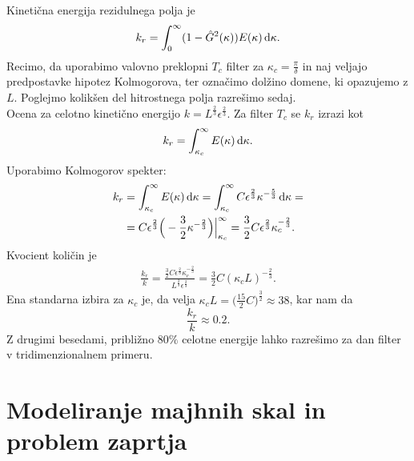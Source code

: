 \documentclass[mat2, tisk]{fmfdelo}
\begin{document}
\begin{primer}
Kinetična energija rezidulnega polja je 
$$
k_r = \int_{0}^{\infty} (1 - \hat{G}^2(\kappa)) E(\kappa) \dif \kappa.
$$
Recimo, da uporabimo valovno preklopni $T_c$ filter za $\kappa_c = \frac{\pi}{\delta}$ in naj veljajo
predpostavke hipotez Kolmogorova, ter označimo dolžino domene, ki opazujemo z $L$. 
Poglejmo kolikšen del hitrostnega polja razrešimo sedaj. \\

Ocena za celotno kinetično energijo $k = L^\frac{2}{3} \epsilon^\frac{2}{3}$. 
Za filter $T_c$ se $k_r$ izrazi kot 
$$
k_r = \int_{\kappa_c}^{\infty} E(\kappa) \dif \kappa. 
$$
Uporabimo Kolmogorov spekter: 
\begin{align*}
k_r &= \int_{\kappa_c}^{\infty} E(\kappa) \dif \kappa = \int_{\kappa_c}^{\infty} C \epsilon^{\frac{2}{3}} \kappa^{-\frac{5}{3}} \dif \kappa = \\
&= C \epsilon^{\frac{2}{3}} \Big(- \frac{3}{2} \kappa^{-\frac{2}{3}}\Big)\Big|_{\kappa_c}^\infty = \frac{3}{2} C \epsilon^{\frac{2}{3}}\kappa_c^{-\frac{2}{3}}.
\end{align*}
Kvocient količin je 
\begin{align*}
\frac{k_r}{k} = \frac{\frac{3}{2} C \epsilon^{\frac{2}{3}}\kappa_c^{-\frac{2}{3}}}{L^\frac{2}{3} \epsilon^\frac{2}{3}} = 
\frac{3}{2}C (\kappa_c L)^{-\frac{2}{3}}.
\end{align*}
Ena standarna izbira za $\kappa_c$ je, da velja $\kappa_c L = \Big(\frac{15}{2}C\Big)^\frac{3}{2} \approx 38$, 
kar nam da 
$$
\frac{k_r}{k} \approx 0.2.
$$
Z drugimi besedami, približno $80\%$ celotne energije lahko razrešimo 
za dan filter v tridimenzionalnem primeru.
\end{primer}

\section{Modeliranje majhnih skal in problem zaprtja}
\end{document}
